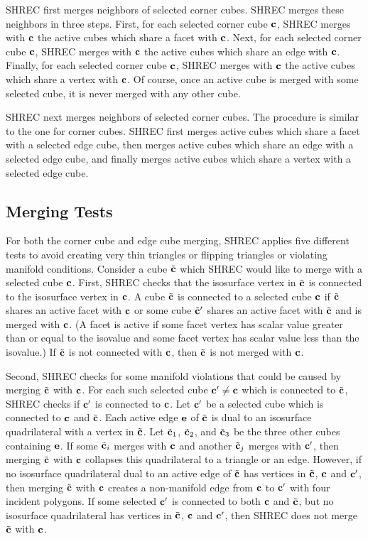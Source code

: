 SHREC first merges neighbors of selected corner cubes.
SHREC merges these neighbors in three steps.
First, for each selected corner cube $\mathbf{c}$,
SHREC merges with $\mathbf{c}$ the active cubes which share a facet with $\mathbf{c}$.
Next, for each selected corner cube $\mathbf{c}$,
SHREC merges with $\mathbf{c}$ the active cubes which share an edge with $\mathbf{c}$.
Finally, for each selected corner cube $\mathbf{c}$,
SHREC merges with $\mathbf{c}$ the active cubes which share a vertex with $\mathbf{c}$.
Of course, once an active cube is merged with some selected cube,
it is never merged with any other cube.

SHREC next merges neighbors of selected corner cubes.
The procedure is similar to the one for corner cubes.
SHREC first merges active cubes which share a facet with a selected edge cube,
then merges active cubes which share an edge with a selected edge cube,
and finally merges active cubes which share a vertex 
with a selected edge cube.

\subsection{Merging Tests}
\label{section:merging_tests}

For both the corner cube and edge cube merging,
SHREC applies five different tests to avoid creating very thin triangles
or flipping triangles or violating manifold conditions.
Consider a cube ${\tilde{\mathbf{c}}}$ which SHREC would like to merge 
with a selected cube $\mathbf{c}$.
First, SHREC checks that the isosurface vertex in ${\tilde{\mathbf{c}}}$
is connected to the isosurface vertex in $\mathbf{c}$.
A cube ${\tilde{\mathbf{c}}}$ is connected to a selected cube $\mathbf{c}$
if ${\tilde{\mathbf{c}}}$ shares an active facet with $\mathbf{c}$
or some cube ${\tilde{\mathbf{c}}}'$ shares an active facet with ${\tilde{\mathbf{c}}}$ and
is merged with $\mathbf{c}$.
(A facet is active if some facet vertex has scalar value greater than
or equal to the isovalue and some facet vertex has scalar value less
than the isovalue.)
If ${\tilde{\mathbf{c}}}$ is not connected with $\mathbf{c}$, then ${\tilde{\mathbf{c}}}$ is not merged with $\mathbf{c}$.

Second, SHREC checks for some manifold violations that
could be caused by merging ${\tilde{\mathbf{c}}}$ with $\mathbf{c}$.
For each such selected cube $\mathbf{c}' \neq \mathbf{c}$ which is connected to ${\tilde{\mathbf{c}}}$,
SHREC checks if $\mathbf{c}'$ is connected to $\mathbf{c}$.
Let $\mathbf{c}'$ be a selected cube which is connected to $\mathbf{c}$ and ${\tilde{\mathbf{c}}}$.
Each active edge $\mathbf{e}$ of ${\tilde{\mathbf{c}}}$ is dual to an isosurface quadrilateral
with a vertex in ${\tilde{\mathbf{c}}}$.
Let ${\tilde{\mathbf{c}}}_1$, ${\tilde{\mathbf{c}}}_2$, and ${\tilde{\mathbf{c}}}_3$ be the three other cubes containing $\mathbf{e}$.
If some ${\tilde{\mathbf{c}}}_i$ merges with $\mathbf{c}$ and another ${\tilde{\mathbf{c}}}_j$ merges with $\mathbf{c}'$,
then merging ${\tilde{\mathbf{c}}}$ with $\mathbf{c}$ collapses this quadrilateral to a triangle
or an edge.
However, if no isosurface quadrilateral dual to an active edge of ${\tilde{\mathbf{c}}}$
has vertices in ${\tilde{\mathbf{c}}}$, $\mathbf{c}$ and $\mathbf{c}'$,
then merging ${\tilde{\mathbf{c}}}$ with $\mathbf{c}$ creates a non-manifold edge 
from $\mathbf{c}$ to $\mathbf{c}'$ with four incident polygons.
If some selected $\mathbf{c}'$ is connected to both $\mathbf{c}$ and ${\tilde{\mathbf{c}}}$,
but no isosurface quadrilateral has vertices in ${\tilde{\mathbf{c}}}$, $\mathbf{c}$ and $\mathbf{c}'$,
then SHREC does not merge ${\tilde{\mathbf{c}}}$ with $\mathbf{c}$.

